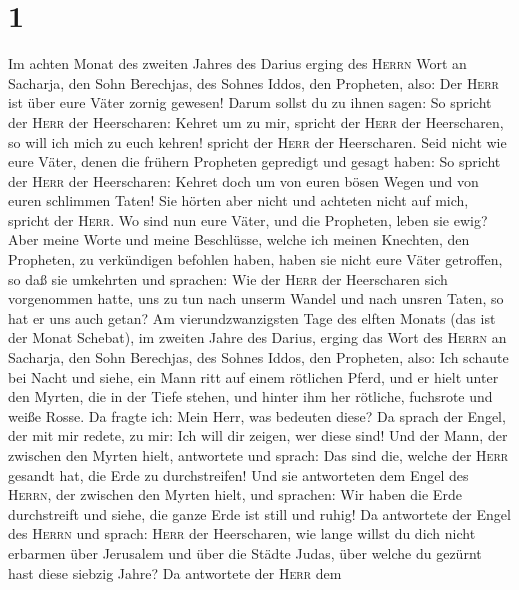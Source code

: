 \hypertarget{section}{%
\section{1}\label{section}}

 Im achten Monat des zweiten Jahres des Darius erging des
\textsc{Herrn} Wort an Sacharja, den Sohn Berechjas, des Sohnes Iddos,
den Propheten, also:  Der \textsc{Herr} ist über eure
Väter zornig gewesen!  Darum sollst du zu ihnen sagen: So
spricht der \textsc{Herr} der Heerscharen: Kehret um zu mir, spricht der
\textsc{Herr} der Heerscharen, so will ich mich zu euch kehren! spricht
der \textsc{Herr} der Heerscharen.  Seid nicht wie eure
Väter, denen die frühern Propheten gepredigt und gesagt haben: So
spricht der \textsc{Herr} der Heerscharen: Kehret doch um von euren
bösen Wegen und von euren schlimmen Taten! Sie hörten aber nicht und
achteten nicht auf mich, spricht der \textsc{Herr}.  Wo
sind nun eure Väter, und die Propheten, leben sie ewig? 
Aber meine Worte und meine Beschlüsse, welche ich meinen Knechten, den
Propheten, zu verkündigen befohlen haben, haben sie nicht eure Väter
getroffen, so daß sie umkehrten und sprachen: Wie der \textsc{Herr} der
Heerscharen sich vorgenommen hatte, uns zu tun nach unserm Wandel und
nach unsren Taten, so hat er uns auch getan?  Am
vierundzwanzigsten Tage des elften Monats (das ist der Monat Schebat),
im zweiten Jahre des Darius, erging das Wort des \textsc{Herrn} an
Sacharja, den Sohn Berechjas, des Sohnes Iddos, den Propheten, also:
 Ich schaute bei Nacht und siehe, ein Mann ritt auf einem
rötlichen Pferd, und er hielt unter den Myrten, die in der Tiefe stehen,
und hinter ihm her rötliche, fuchsrote und weiße Rosse. 
Da fragte ich: Mein Herr, was bedeuten diese? Da sprach der Engel, der
mit mir redete, zu mir: Ich will dir zeigen, wer diese sind!
 Und der Mann, der zwischen den Myrten hielt, antwortete
und sprach: Das sind die, welche der \textsc{Herr} gesandt hat, die Erde
zu durchstreifen!  Und sie antworteten dem Engel des
\textsc{Herrn}, der zwischen den Myrten hielt, und sprachen: Wir haben
die Erde durchstreift und siehe, die ganze Erde ist still und ruhig!
 Da antwortete der Engel des \textsc{Herrn} und sprach:
\textsc{Herr} der Heerscharen, wie lange willst du dich nicht erbarmen
über Jerusalem und über die Städte Judas, über welche du gezürnt hast
diese siebzig Jahre?  Da antwortete der \textsc{Herr} dem
